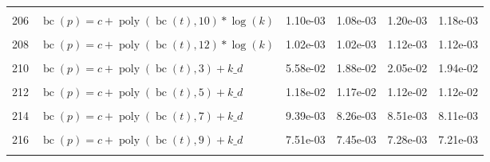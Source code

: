 \documentclass[12pt,a4paper]{article}
\DeclareMathOperator{\bc}{bc}
\DeclareMathOperator{\poly}{poly}
\begin{document}
\begin{longtable}[t]{ll>{\raggedleft\arraybackslash}p{2cm}>{\raggedleft\arraybackslash}p{2cm}>{\raggedleft\arraybackslash}p{2cm}>{\raggedleft\arraybackslash}p{2cm}}
\cellcolor{gray!6}{205} & \cellcolor{gray!6}{$\bc(p) = c + \poly\left( \bc(t), 9 \right) * \log(k)$} & \cellcolor{gray!6}{2.11e-03} & \cellcolor{gray!6}{1.98e-03} & \cellcolor{gray!6}{2.29e-03} & \cellcolor{gray!6}{2.14e-03}\\
206 & $\bc(p) = c + \poly\left( \bc(t), 10 \right) * \log(k)$ & 1.10e-03 & 1.08e-03 & 1.20e-03 & 1.18e-03\\
\cellcolor{gray!6}{207} & \cellcolor{gray!6}{$\bc(p) = c + \poly\left( \bc(t), 11 \right) * \log(k)$} & \cellcolor{gray!6}{1.13e-03} & \cellcolor{gray!6}{1.09e-03} & \cellcolor{gray!6}{1.24e-03} & \cellcolor{gray!6}{1.19e-03}\\
208 & $\bc(p) = c + \poly\left( \bc(t), 12 \right) * \log(k)$ & 1.02e-03 & 1.02e-03 & 1.12e-03 & 1.12e-03\\
\cellcolor{gray!6}{209} & \cellcolor{gray!6}{$\bc(p) = c + \poly\left( \bc(t), 13 \right) * \log(k)$} & \cellcolor{gray!6}{9.99e-04} & \cellcolor{gray!6}{9.96e-04} & \cellcolor{gray!6}{1.11e-03} & \cellcolor{gray!6}{1.10e-03}\\
210 & $\bc(p) = c + \poly\left( \bc(t), 3 \right) + k\_d$ & 5.58e-02 & 1.88e-02 & 2.05e-02 & 1.94e-02\\
\cellcolor{gray!6}{211} & \cellcolor{gray!6}{$\bc(p) = c + \poly\left( \bc(t), 4 \right) + k\_d$} & \cellcolor{gray!6}{2.38e-02} & \cellcolor{gray!6}{2.24e-02} & \cellcolor{gray!6}{2.47e-02} & \cellcolor{gray!6}{2.39e-02}\\
212 & $\bc(p) = c + \poly\left( \bc(t), 5 \right) + k\_d$ & 1.18e-02 & 1.17e-02 & 1.12e-02 & 1.12e-02\\
\cellcolor{gray!6}{213} & \cellcolor{gray!6}{$\bc(p) = c + \poly\left( \bc(t), 6 \right) + k\_d$} & \cellcolor{gray!6}{1.00e-02} & \cellcolor{gray!6}{9.13e-03} & \cellcolor{gray!6}{1.02e-02} & \cellcolor{gray!6}{9.12e-03}\\
214 & $\bc(p) = c + \poly\left( \bc(t), 7 \right) + k\_d$ & 9.39e-03 & 8.26e-03 & 8.51e-03 & 8.11e-03\\
\cellcolor{gray!6}{215} & \cellcolor{gray!6}{$\bc(p) = c + \poly\left( \bc(t), 8 \right) + k\_d$} & \cellcolor{gray!6}{7.43e-03} & \cellcolor{gray!6}{7.40e-03} & \cellcolor{gray!6}{7.18e-03} & \cellcolor{gray!6}{7.14e-03}\\
216 & $\bc(p) = c + \poly\left( \bc(t), 9 \right) + k\_d$ & 7.51e-03 & 7.45e-03 & 7.28e-03 & 7.21e-03\\
\cellcolor{gray!6}{217} & \cellcolor{gray!6}{$\bc(p) = c + \poly\left( \bc(t), 10 \right) + k\_d$} & \cellcolor{gray!6}{7.25e-03} & \cellcolor{gray!6}{7.24e-03} & \cellcolor{gray!6}{6.98e-03} & \cellcolor{gray!6}{6.95e-03}\\

\end{longtable}
\end{document}
